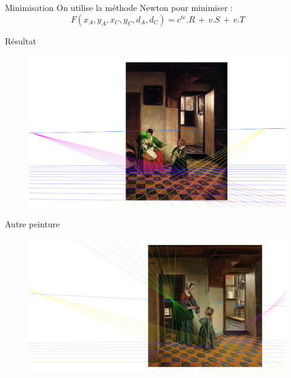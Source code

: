\documentclass{beamer}
\begin{document}
	\begin{frame}{Minimisation}
		On utilise la méthode Newton pour minimiser :
		$$ F(x_A, y_A, x_C, y_C, d_A, d_C) = c^{te} . R \, + \, v . S \, + \, v . T $$
	\end{frame}

	\begin{frame}{Résultat}
		\begin{figure}[h]
			\centering
			\includegraphics[width=\linewidth]{perf.jpg}
		\end{figure}
	\end{frame}

	\begin{frame}{Autre peinture}
		\begin{figure}[h]
			\centering
			\includegraphics[width=\linewidth]{final_bis.jpg}
		\end{figure}
	\end{frame}
\end{document}
